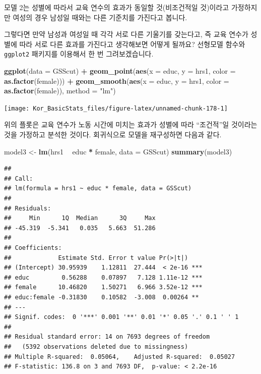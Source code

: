 \documentclass[]{book}
\newenvironment{Shaded}{\begin{snugshade}}{\end{snugshade}}
\newcommand{\DataTypeTok}[1]{\textcolor[rgb]{0.13,0.29,0.53}{#1}}
\newcommand{\KeywordTok}[1]{\textcolor[rgb]{0.13,0.29,0.53}{\textbf{#1}}}
\newcommand{\NormalTok}[1]{#1}
\newcommand{\OperatorTok}[1]{\textcolor[rgb]{0.81,0.36,0.00}{\textbf{#1}}}
\newcommand{\StringTok}[1]{\textcolor[rgb]{0.31,0.60,0.02}{#1}}
\begin{document}
모델 2는 성별에 따라서 교육 연수의 효과가 동일할 것(비조건적일 것)이라고 가정하지만 여성의 경우 남성일 때와는 다른 기준치를 가진다고 봅니다.

그렇다면 만약 남성과 여성일 때 각각 서로 다른 기울기를 갖는다고, 즉 교육 연수가 성별에 따라 서로 다른 효과를 가진다고 생각해보면 어떻게 될까요? 선형모델 함수와 \texttt{ggplot2} 패키지를 이용해서 한 번 그려보겠습니다.

\begin{Shaded}
\begin{Highlighting}[]
\KeywordTok{ggplot}\NormalTok{(}\DataTypeTok{data =}\NormalTok{ GSScut) }\OperatorTok{+}\StringTok{ }
\StringTok{  }\KeywordTok{geom_point}\NormalTok{(}\KeywordTok{aes}\NormalTok{(}\DataTypeTok{x =}\NormalTok{ educ, }\DataTypeTok{y =}\NormalTok{ hrs1, }\DataTypeTok{color =} \KeywordTok{as.factor}\NormalTok{(female))) }\OperatorTok{+}\StringTok{ }
\StringTok{  }\KeywordTok{geom_smooth}\NormalTok{(}\KeywordTok{aes}\NormalTok{(}\DataTypeTok{x =}\NormalTok{ educ, }\DataTypeTok{y =}\NormalTok{ hrs1, }\DataTypeTok{color =} \KeywordTok{as.factor}\NormalTok{(female)), }\DataTypeTok{method =} \StringTok{"lm"}\NormalTok{)}
\end{Highlighting}
\end{Shaded}

\begin{center}\texttt{[image: Kor\_BasicStats\_files/figure-latex/unnamed-chunk-178-1]} \end{center}

위의 플롯은 교육 연수가 노동 시간에 미치는 효과가 성별에 따라 ``조건적''일 것이라는 것을 가정하고 분석한 것이다. 회귀식으로 모델을 재구성하면 다음과 같다.

\begin{Shaded}
\begin{Highlighting}[]
\NormalTok{model3 <-}\StringTok{ }\KeywordTok{lm}\NormalTok{(hrs1 }\OperatorTok{~}\StringTok{ }\NormalTok{educ }\OperatorTok{*}\StringTok{ }\NormalTok{female, }\DataTypeTok{data =}\NormalTok{ GSScut) }
\KeywordTok{summary}\NormalTok{(model3)}
\end{Highlighting}
\end{Shaded}

\begin{verbatim}
## 
## Call:
## lm(formula = hrs1 ~ educ * female, data = GSScut)
## 
## Residuals:
##     Min      1Q  Median      3Q     Max 
## -45.319  -5.341   0.035   5.663  51.286 
## 
## Coefficients:
##             Estimate Std. Error t value Pr(>|t|)    
## (Intercept) 30.95939    1.12811  27.444  < 2e-16 ***
## educ         0.56288    0.07897   7.128 1.11e-12 ***
## female      10.46820    1.50271   6.966 3.52e-12 ***
## educ:female -0.31830    0.10582  -3.008  0.00264 ** 
## ---
## Signif. codes:  0 '***' 0.001 '**' 0.01 '*' 0.05 '.' 0.1 ' ' 1
## 
## Residual standard error: 14 on 7693 degrees of freedom
##   (5392 observations deleted due to missingness)
## Multiple R-squared:  0.05064,    Adjusted R-squared:  0.05027 
## F-statistic: 136.8 on 3 and 7693 DF,  p-value: < 2.2e-16
\end{verbatim}
\end{document}
